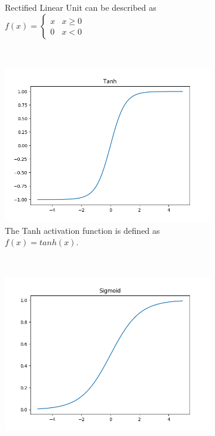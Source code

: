 \begin{figure}[h!]
\begin{subfigure}[t]{0.45\textwidth}
		\caption{Rectified Linear Unit can be described as $f(x) = \begin{cases} x & x \geq 0 \\ 0 & x < 0 \end{cases}$}
	\end{subfigure}
	~
	\begin{subfigure}[t]{0.4\textwidth}
		\centering
		\includegraphics[width=\textwidth]{img/methodology_neuralNetwork_activationFunction_tanh.png}
		\caption{The Tanh activation function is defined as $f(x) = tanh(x)$.}
	\end{subfigure}%
	~ 
	\begin{subfigure}[t]{0.4\textwidth}
		\centering
		\includegraphics[width=\textwidth]{img/methodology_neuralNetwork_activationFunction_sigmoid.png}

\end{subfigure}
\end{figure}
